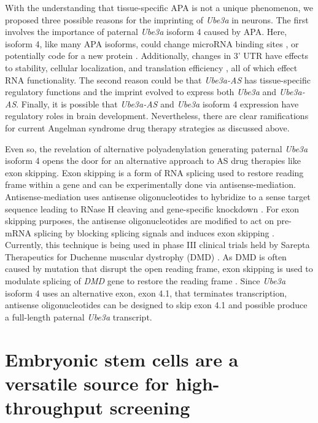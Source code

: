 With the understanding that tissue-specific APA is not a unique phenomenon, we proposed three possible reasons for the imprinting of \textit{Ube3a} in neurons. The first involves the importance of paternal \textit{Ube3a} isoform 4 caused by APA. Here, isoform 4, like many APA isoforms, could change microRNA binding sites \cite{Sandberg2008}, or potentially code for a new protein \cite{Alt1980,Tian2007}. Additionally, changes in 3' UTR have effects to stability, cellular localization, and translation efficiency \cite{Fabian2010,Andreassi2009}, all of which effect RNA functionality. The second reason could be that \textit{Ube3a-AS} has tissue-specific regulatory functions and the imprint evolved to express both \textit{Ube3a} and \textit{Ube3a-AS}. Finally, it is possible that \textit{Ube3a-AS} and \textit{Ube3a} isoform 4 expression have regulatory roles in brain development. Nevertheless, there are clear ramifications for current Angelman syndrome drug therapy strategies as discussed above.

Even so, the revelation of alternative polyadenylation generating paternal \textit{Ube3a} isoform 4 opens the door for an alternative approach to AS drug therapies like exon skipping. Exon skipping is a form of RNA splicing used to restore reading frame within a gene and can be experimentally done via antisense-mediation. Antisense-mediation uses antisense oligonucleotides to hybridize to a sense target sequence leading to RNase H cleaving and gene-specific knockdown \cite{Hausen1970}. For exon skipping purposes, the antisense oligonucleotides are modified to act on pre-mRNA splicing by blocking splicing signals and induces exon skipping \cite{Kole2001}. Currently, this technique is being used in phase III clinical trials held by Sarepta Therapeutics for Duchenne muscular dystrophy (DMD) \cite{Kole2015}. As DMD is often caused by mutation that disrupt the open reading frame, exon skipping is used to modulate splicing of \textit{DMD} gene to restore the reading frame \cite{Hoffman1987,Monaco1988,Koenig1989}. Since \textit{Ube3a} isoform 4 uses an alternative exon, exon 4.1, that terminates transcription, antisense oligonucleotides can be designed to skip exon 4.1 and possible produce a full-length paternal \textit{Ube3a} transcript.

\section{Embryonic stem cells are a versatile source for high-throughput screening}


